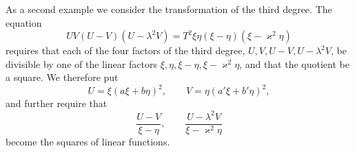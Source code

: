 \documentclass[11pt]{article}
\begin{document}
As a second example we consider the transformation of the third degree. The equation
\begin{equation}
UV(U-V)(U-\lambda^2V)=T^2\xi\eta(\xi-\eta)(\xi-\varkappa^2\eta)
\tag{1}
\end{equation}
requires that each of the four factors of the third degree, $U,V,U-V,U-\lambda^2V$, be divisible by one of the linear factors $\xi,\eta,\xi-\eta,\xi-\varkappa^2\eta$, and that the quotient be a square. We therefore put
\begin{equation}
U=\xi(a\xi+b\eta)^2,\qquad
V=\eta(a'\xi+b'\eta)^2,
\tag{2}
\end{equation}
and further require that
\begin{equation}
\frac{U-V}{\xi-\eta},\qquad
\frac{U-\lambda^2V}{\xi-\varkappa^2\eta}
\tag{3}
\end{equation}
become the squares of linear functions.
\end{document}
